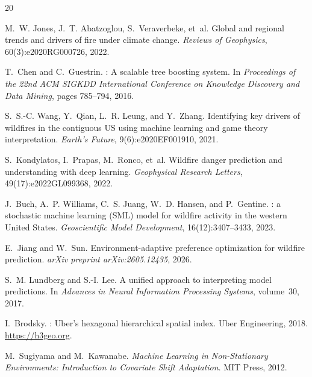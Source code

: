 \documentclass[11pt]{article}
\begin{document}

\begin{thebibliography}{20}

M.~W. Jones, J.~T. Abatzoglou, S.~Veraverbeke, et~al.
\newblock Global and regional trends and drivers of fire under climate change.
\newblock \emph{Reviews of Geophysics}, 60(3):e2020RG000726, 2022.

T.~Chen and C.~Guestrin.
: A scalable tree boosting system.
\newblock In \emph{Proceedings of the 22nd ACM SIGKDD International Conference
  on Knowledge Discovery and Data Mining}, pages 785--794, 2016.

S.~S.-C. Wang, Y.~Qian, L.~R. Leung, and Y.~Zhang.
\newblock Identifying key drivers of wildfires in the contiguous {US} using
  machine learning and game theory interpretation.
\newblock \emph{Earth's Future}, 9(6):e2020EF001910, 2021.

S.~Kondylatos, I.~Prapas, M.~Ronco, et~al.
\newblock Wildfire danger prediction and understanding with deep learning.
\newblock \emph{Geophysical Research Letters}, 49(17):e2022GL099368, 2022.

J.~Buch, A.~P. Williams, C.~S. Juang, W.~D. Hansen, and P.~Gentine.
: a stochastic machine learning ({SML}) model for
  wildfire activity in the western {United States}.
\newblock \emph{Geoscientific Model Development}, 16(12):3407--3433, 2023.

E.~Jiang and W.~Sun.
\newblock Environment-adaptive preference optimization for wildfire
  prediction.
\newblock \emph{arXiv preprint arXiv:2605.12435}, 2026.

S.~M. Lundberg and S.-I. Lee.
\newblock A unified approach to interpreting model predictions.
\newblock In \emph{Advances in Neural Information Processing Systems},
  volume~30, 2017.

I.~Brodsky.
: Uber's hexagonal hierarchical spatial index.
\newblock Uber Engineering, 2018.
\newblock \url{https://h3geo.org}.

M.~Sugiyama and M.~Kawanabe.
\newblock \emph{Machine Learning in Non-Stationary Environments: Introduction
  to Covariate Shift Adaptation}.
\newblock MIT Press, 2012.


\end{thebibliography}
\end{document}
